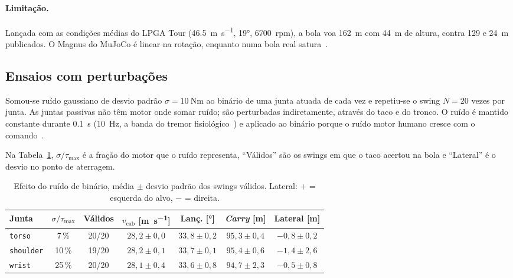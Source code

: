 \documentclass[11pt,a4paper]{article}
\begin{document}
\paragraph{Limitação.}
Lançada com as condições médias do LPGA Tour (\SI{46.5}{\meter\per\second},
\ang{19}, \SI{6700}{rpm}), a bola voa \SI{162}{\meter} com \SI{44}{\meter} de
altura, contra 129 e \SI{24}{\meter} publicados. O Magnus do MuJoCo é linear na
rotação, enquanto numa bola real satura~\cite{smits1994}.

\subsection{Ensaios com perturbações}
\label{sec:pert}

Somou-se ruído gaussiano de desvio padrão $\sigma = \SI{10}{\newton\meter}$ ao
binário de uma junta atuada de cada vez e repetiu-se o swing $N=20$ vezes por
junta. As juntas passivas não têm motor onde somar ruído; são perturbadas
indiretamente, através do taco e do tronco. O ruído é mantido constante
durante \SI{0.1}{\second} (\SI{10}{\hertz}, a banda do tremor
fisiológico~\cite{elble1990,deuschl1998}) e aplicado ao binário porque o ruído
motor humano cresce com o comando~\cite{harris1998}.

Na Tabela~\ref{tab:pert}, $\sigma/\tau_{\max}$ é a fração do motor que o ruído
representa, ``Válidos'' são os swings em que o taco acertou na bola e
``Lateral'' é o desvio no ponto de aterragem.

\begin{table}[H]
\centering
\caption{Efeito do ruído de binário, média $\pm$ desvio padrão dos swings
válidos. Lateral: $+$ = esquerda do alvo, $-$ = direita.}
\label{tab:pert}
\small
\begin{tabular}{lcccccc}
\toprule
\rowcolor{tabcab}
Junta & $\sigma/\tau_{\max}$ & Válidos & $v_{\text{cab}}$ [\si{\meter\per\second}] & Lanç. [\si{\degree}] & \emph{Carry} [\si{\meter}] & Lateral [\si{\meter}] \\
\midrule
\texttt{torso}    & 7\,\%  & 20/20 & $28{,}2 \pm 0{,}0$ & $33{,}8 \pm 0{,}2$ & $95{,}3 \pm 0{,}4$ & $-0{,}8 \pm 0{,}2$ \\
\texttt{shoulder} & 10\,\% & 19/20 & $28{,}2 \pm 0{,}1$ & $33{,}7 \pm 0{,}1$ & $95{,}4 \pm 0{,}6$ & $-1{,}4 \pm 2{,}6$ \\
\texttt{wrist}    & 25\,\% & 20/20 & $28{,}1 \pm 0{,}4$ & $33{,}6 \pm 0{,}8$ & $94{,}7 \pm 2{,}3$ & $-0{,}5 \pm 0{,}8$ \\
\bottomrule
\end{tabular}
\end{table}
\end{document}
